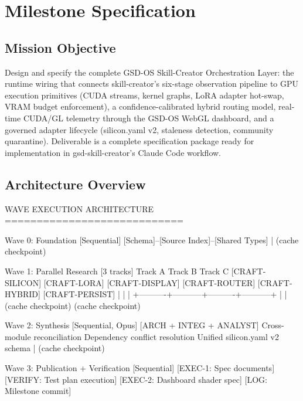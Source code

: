 \documentclass[11pt,letterpaper]{article}
\newcommand{\stageheader}[2]{%
  \noindent\colorbox{#2}{\makebox[\textwidth][l]{%
    \textcolor{white}{\bfseries\sffamily\hspace{6pt}#1\hspace{6pt}}}}%
  \vspace{0.5em}\par%
}
\begin{document}
\newpage
\stageheader{STAGE 3 --- MISSION PACKAGE}{tertiary}

\section{Milestone Specification}

\subsection{Mission Objective}

Design and specify the complete GSD-OS Skill-Creator Orchestration Layer: the runtime wiring that connects skill-creator's six-stage observation pipeline to GPU execution primitives (CUDA streams, kernel graphs, LoRA adapter hot-swap, VRAM budget enforcement), a confidence-calibrated hybrid routing model, real-time CUDA/GL telemetry through the GSD-OS WebGL dashboard, and a governed adapter lifecycle (silicon.yaml v2, staleness detection, community quarantine). Deliverable is a complete specification package ready for implementation in gsd-skill-creator's Claude Code workflow.

\subsection{Architecture Overview}

\begin{asciibox}
WAVE EXECUTION ARCHITECTURE
============================

Wave 0: Foundation [Sequential]
  [Schema]--[Source Index]--[Shared Types]
               |
       (cache checkpoint)

Wave 1: Parallel Research [3 tracks]
  Track A                Track B                Track C
  [CRAFT-SILICON]        [CRAFT-LORA]           [CRAFT-DISPLAY]
  [CRAFT-ROUTER]         [CRAFT-HYBRID]         [CRAFT-PERSIST]
       |                      |                      |
       +----------+-----------+----------+-----------+
                  |                      |
          (cache checkpoint)     (cache checkpoint)

Wave 2: Synthesis [Sequential, Opus]
  [ARCH + INTEG + ANALYST]
  Cross-module reconciliation
  Dependency conflict resolution
  Unified silicon.yaml v2 schema
               |
       (cache checkpoint)

Wave 3: Publication + Verification [Sequential]
  [EXEC-1: Spec documents]
  [VERIFY: Test plan execution]
  [EXEC-2: Dashboard shader spec]
  [LOG: Milestone commit]
\end{asciibox}
\end{document}
